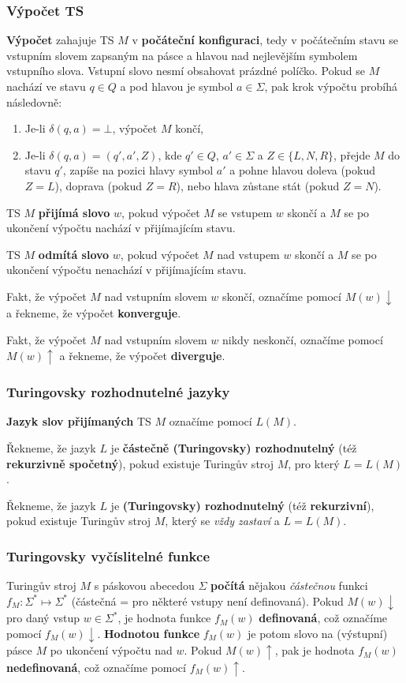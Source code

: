 \documentclass[11pt]{report} %
\begin{document}
\subsubsection{Výpočet TS}
\textbf{Výpočet} zahajuje TS $M$ v \textbf{počáteční konfiguraci}, tedy v počátečním stavu se vstupním slovem zapsaným na pásce a hlavou nad nejlevějším symbolem vstupního slova. Vstupní slovo nesmí obsahovat prázdné políčko. Pokud se $M$ nachází ve stavu $q \in Q$ a pod hlavou je symbol $a \in \Sigma$, pak krok výpočtu probíhá následovně:
\begin{enumerate}
	\leftskip 40pt
	\setlength{\itemsep}{0pt}
	\item Je-li $\delta(q, a) = \bot$, výpočet $M$ končí,
	\item Je-li $\delta(q, a) = (q', a', Z)$, kde $q' \in Q$, $a' \in \Sigma$ a $Z \in \{L, N, R\}$, přejde $M$ do stavu $q'$, zapíše na pozici hlavy symbol $a'$ a pohne hlavou doleva (pokud $Z = L$), doprava (pokud $Z = R$), nebo hlava zůstane stát (pokud $Z = N$).	
\end{enumerate}

TS $M$ \textbf{přijímá slovo} $w$, pokud výpočet $M$ se vstupem $w$ skončí a $M$ se po ukončení výpočtu nachází v přijímajícím stavu. 

TS $M$ \textbf{odmítá slovo} $w$, pokud výpočet $M$ nad vstupem $w$ skončí a $M$ se po ukončení výpočtu nenachází v přijímajícím stavu. 

Fakt, že výpočet $M$ nad vstupním slovem $w$ skončí, označíme pomocí $M(w){\downarrow}$ a řekneme, že výpočet \textbf{konverguje}. 

Fakt, že výpočet $M$ nad vstupním slovem $w$ nikdy neskončí, označíme pomocí $M(w){\uparrow}$ a řekneme, že výpočet \textbf{diverguje}.

\subsubsection{Turingovsky rozhodnutelné jazyky}
\textbf{Jazyk slov přijímaných} TS $M$ označíme pomocí $L(M)$. 

Řekneme, že jazyk $L$ je \textbf{částečně (Turingovsky) rozhodnutelný} (též \textbf{rekurzivně spočetný}), pokud existuje
Turingův stroj $M$, pro který $L = L(M)$.

Řekneme, že jazyk $L$ je \textbf{(Turingovsky) rozhodnutelný} (též \textbf{rekurzivní}), pokud existuje Turingův stroj $M$, který se \textit{vždy zastaví} a $L = L(M)$.

\subsubsection{Turingovsky vyčíslitelné funkce}
Turingův stroj $M$ s páskovou abecedou $\Sigma$ \textbf{počítá} nějakou \textit{částečnou} funkci $f_M : \Sigma^* \mapsto \Sigma^*$ (částečná = pro některé vstupy není definovaná). Pokud $M(w){\downarrow}$ pro daný vstup $w \in \Sigma^*$, je hodnota funkce $f_M(w)$ \textbf{definovaná}, což označíme pomocí $f_M(w){\downarrow}$. \textbf{Hodnotou funkce} $f_M(w)$ je potom slovo na (výstupní) pásce $M$ po ukončení výpočtu nad $w$. Pokud $M(w){\uparrow}$, pak je hodnota $f_M(w)$ \textbf{nedefinovaná}, což označíme pomocí $f_M(w){\uparrow}$. 
\end{document}
